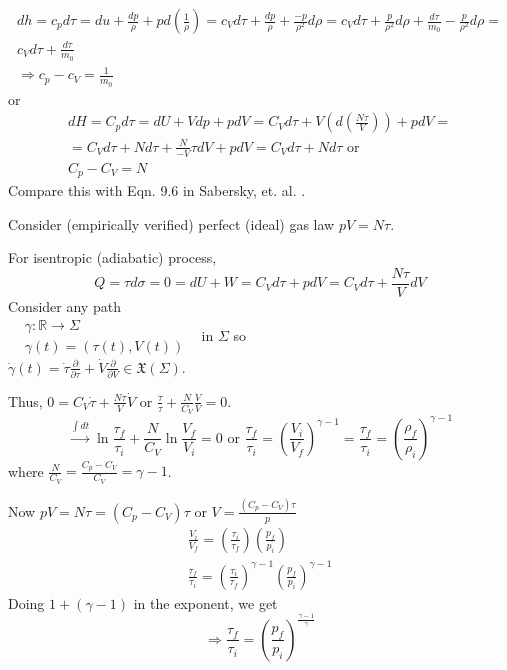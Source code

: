 \documentclass[twoside,landscape,10pt]{amsart}
\theoremstyle{plain}
\theoremstyle{definition}
\theoremstyle{remark}
\theoremstyle{remark}
\begin{document}
\begin{multicols*}{2}
\[
\begin{gathered}
dh = c_p d\tau = du + \frac{dp}{ \rho } + p d\left(\frac{1}{\rho} \right) = c_V d\tau + \frac{dp}{\rho } + \frac{-p}{\rho^2} d\rho = c_V d\tau + \frac{p}{\rho^2 } d\rho + \frac{d\tau }{m_0} - \frac{p}{\rho^2 } d\rho = \\
c_V d\tau + \frac{ d\tau}{m_0} \\
\Longrightarrow c_p - c_V = \frac{1}{m_0}
\end{gathered}
\]
or
\begin{equation}
\begin{gathered}
dH = C_p d\tau = dU + Vdp + pdV = C_V d\tau + V (d\left(\frac{N\tau}{V}\right) ) + p dV = \\
= C_V d\tau + Nd\tau + \frac{N}{-V} \tau dV + pdV = C_V d\tau + Nd\tau \text{ or }  \\ 
\boxed{ C_p - C_V = N}
\end{gathered}
\end{equation}
Compare this with Eqn. 9.6 in Sabersky, et. al. \cite{SAHG1998}.

Consider (empirically verified) perfect (ideal) gas law $pV = N\tau$. 

For isentropic (adiabatic) process, 
\[
Q = \tau d\sigma = 0 = dU + W = C_V d\tau + pdV = C_V d\tau + \frac{N\tau}{V} dV 
\]
Consider any path \\
$\begin{aligned} 
& \gamma : \mathbb{R} \to \Sigma \\
& \gamma(t) = (\tau(t), V(t)) \end{aligned}$ \qquad \, in $\Sigma$ so \\
$\dot{\gamma}(t) = \dot{\tau} \frac{ \partial }{ \partial \tau } + \dot{V} \frac{ \partial }{ \partial V} \in \mathfrak{X}(\Sigma)$.

Thus, $0 = C_V \dot{\tau} + \frac{N\tau}{V} \dot{V}$ or $\frac{ \dot{\tau}}{\tau} + \frac{N}{C_V}\frac{\dot{V}}{V} = 0$.
\[
\xrightarrow{\int dt} \ln{ \frac{ \tau_f}{\tau_i} } + \frac{N}{C_V} \ln{ \frac{V_f}{V_i} }=  0 \text{ or } \frac{\tau_f}{\tau_i} = \left( \frac{V_i}{V_f} \right)^{\gamma - 1} = \frac{\tau_f}{\tau_i} = \left( \frac{\rho_f}{\rho_i} \right)^{\gamma - 1}
\]
where $\frac{N}{C_V} = \frac{C_p - C_V}{C_V} = \gamma -1$.

Now $pV = N\tau = (C_p - C_V)\tau$ or $V= \frac{ (C_p - C_V) \tau}{p}$
\[
\begin{gathered}
\frac{V_i}{V_f} = \left( \frac{\tau_i}{\tau_f} \right) \left( \frac{p_f}{p_i} \right) \\
\frac{\tau_f}{\tau_i} = \left( \frac{\tau_i}{\tau_f} \right)^{\gamma -1} \left( \frac{p_f}{p_i} \right)^{\gamma -1}
\end{gathered} 
\]
Doing $1 + (\gamma - 1)$ in the exponent, we get
\begin{equation}
\Longrightarrow \boxed{ \frac{\tau_f}{\tau_i} = \left( \frac{p_f}{p_i} \right)^{\frac{\gamma -1 }{\gamma } } }
\end{equation}


\end{multicols*}
\end{document}
